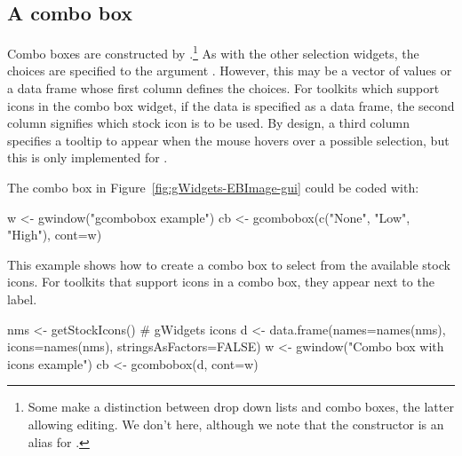 
\subsection{A combo box}
\label{sec:gWidgets-combobox}

Combo boxes are constructed by .\footnote{Some
  make a distinction between drop down lists and combo boxes, the
  latter allowing editing. We don't here, although we note that the
  constructor  is an alias for
  .}  As with the other selection widgets, the choices
  are specified to the argument . However,
  this may be a vector of values or a data frame whose first column
  defines the choices. For toolkits which support icons in the combo
  box widget, if the data is specified as a data frame, the second
  column signifies which stock icon is to be used. By design, a third
  column specifies a tooltip to appear when the mouse hovers over a
  possible selection, but this is only implemented for
  .


The combo box in Figure~\ref{fig:gWidgets-EBImage-gui} could be coded with:
\begin{Schunk}
\begin{Sinput}
 w <- gwindow("gcombobox example")
 cb <- gcombobox(c("None", "Low", "High"), cont=w)
\end{Sinput}
\end{Schunk}



This example shows how to create a combo box to select from the
available stock icons. For toolkits that support icons in a combo box, they
appear next to the label.
\begin{Schunk}
\begin{Sinput}
 nms <- getStockIcons()                  # gWidgets icons
 d <- data.frame(names=names(nms), icons=names(nms), 
                 stringsAsFactors=FALSE)
 w <- gwindow("Combo box with icons example")
 cb <- gcombobox(d, cont=w)
\end{Sinput}
\end{Schunk}


